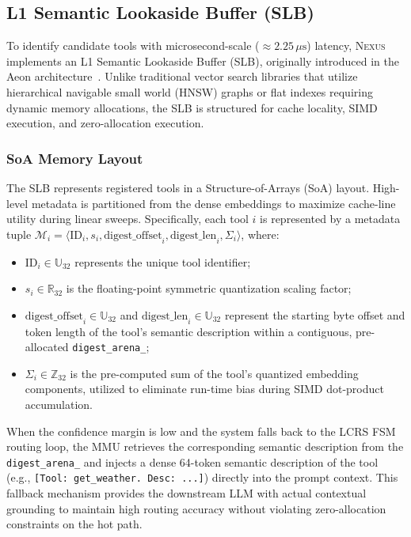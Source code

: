 \documentclass[conference,10pt]{IEEEtran}
\newcommand{\Nexus}{\textsc{Nexus}\xspace}
\begin{document}
\subsection{L1 Semantic Lookaside Buffer (SLB)}
\label{subsec:arch-slb}

To identify candidate tools with microsecond-scale ($\approx 2.25\,\mu\text{s}$) latency, \Nexus implements an L1 Semantic Lookaside Buffer (SLB), originally introduced in the Aeon architecture~\cite{arslan2026aeon}. Unlike traditional vector search libraries that utilize hierarchical navigable small world (HNSW) graphs or flat indexes requiring dynamic memory allocations, the SLB is structured for cache locality, SIMD execution, and zero-allocation execution.

\subsubsection{SoA Memory Layout}
The SLB represents registered tools in a Structure-of-Arrays (SoA) layout. High-level metadata is partitioned from the dense embeddings to maximize cache-line utility during linear sweeps. Specifically, each tool $i$ is represented by a metadata tuple $\mathcal{M}_i = \langle \text{ID}_i, s_i, \text{digest\_offset}_i, \text{digest\_len}_i, \Sigma_i \rangle$, where:
\begin{itemize}
  \item $\text{ID}_i \in \mathbb{U}_{32}$ represents the unique tool identifier;
  \item $s_i \in \mathbb{R}_{32}$ is the floating-point symmetric quantization scaling factor;
  \item $\text{digest\_offset}_i \in \mathbb{U}_{32}$ and $\text{digest\_len}_i \in \mathbb{U}_{32}$ represent the starting byte offset and token length of the tool's semantic description within a contiguous, pre-allocated \texttt{digest\_arena\_};
  \item $\Sigma_i \in \mathbb{Z}_{32}$ is the pre-computed sum of the tool's quantized embedding components, utilized to eliminate run-time bias during SIMD dot-product accumulation.
\end{itemize}

When the confidence margin is low and the system falls back to the LCRS FSM routing loop, the MMU retrieves the corresponding semantic description from the \texttt{digest\_arena\_} and injects a dense 64-token semantic description of the tool (e.g., \texttt{[Tool: get\_weather. Desc: ...]}) directly into the prompt context. This fallback mechanism provides the downstream LLM with actual contextual grounding to maintain high routing accuracy without violating zero-allocation constraints on the hot path.
\end{document}
